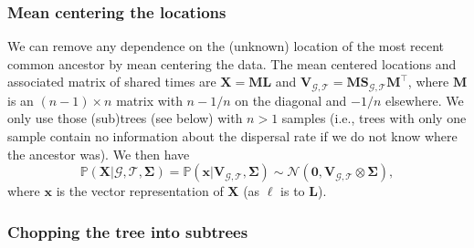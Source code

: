 \documentclass[12pt]{article}
\begin{document}
\subsubsection*{Mean centering the locations}

We can remove any dependence on the (unknown) location of the most recent common ancestor by mean centering the data. 
The mean centered locations and associated matrix of shared times are $\mathbf{X}=\mathbf{M}\mathbf{L}$ and $\mathbf{V}_{\mathcal{G},\mathcal{T}}=\mathbf{M}\mathbf{S}_{\mathcal{G},\mathcal{T}}\mathbf{M}^\intercal$, where $\mathbf{M}$ is an $(n-1)\times n$ matrix with $n-1/n$ on the diagonal and $-1/n$ elsewhere. %
We only use those (sub)trees (see below) with $n>1$ samples (i.e., trees with only one sample contain no information about the dispersal rate if we do not know where the ancestor was).
We then have
%
\begin{equation}\label{eq:PScentered}
\mathbb{P}(\mathbf{X} | \mathcal{G},\mathcal{T}, \mathbf{\Sigma}) = \mathbb{P}(\mathbf{x} | \mathbf{V}_{\mathcal{G},\mathcal{T}}, \mathbf{\Sigma}) \sim \mathcal{N}\left(\mathbf{0}, \mathbf{V}_{\mathcal{G},\mathcal{T}} \otimes \mathbf{\Sigma} \right),
\end{equation}
%
where $\mathbf{x}$ is the vector representation of $\mathbf{X}$ (as $\bm{\ell}$ is to $\mathbf{L}$).


\subsubsection*{Chopping the tree into subtrees}
\end{document}
